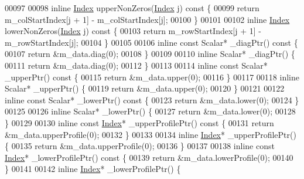 \begin{DoxyCode}
00097 
00098     \textcolor{keyword}{inline} \hyperlink{namespace_eigen_a62e77e0933482dafde8fe197d9a2cfde}{Index} upperNonZeros(\hyperlink{namespace_eigen_a62e77e0933482dafde8fe197d9a2cfde}{Index} j)\textcolor{keyword}{ const }\{
00099         \textcolor{keywordflow}{return} m\_colStartIndex[j + 1] - m\_colStartIndex[j];
00100     \}
00101 
00102     \textcolor{keyword}{inline} \hyperlink{namespace_eigen_a62e77e0933482dafde8fe197d9a2cfde}{Index} lowerNonZeros(\hyperlink{namespace_eigen_a62e77e0933482dafde8fe197d9a2cfde}{Index} j)\textcolor{keyword}{ const }\{
00103         \textcolor{keywordflow}{return} m\_rowStartIndex[j + 1] - m\_rowStartIndex[j];
00104     \}
00105 
00106     \textcolor{keyword}{inline} \textcolor{keyword}{const} Scalar* \_diagPtr()\textcolor{keyword}{ const }\{
00107         \textcolor{keywordflow}{return} &m\_data.diag(0);
00108     \}
00109 
00110     \textcolor{keyword}{inline} Scalar* \_diagPtr() \{
00111         \textcolor{keywordflow}{return} &m\_data.diag(0);
00112     \}
00113 
00114     \textcolor{keyword}{inline} \textcolor{keyword}{const} Scalar* \_upperPtr()\textcolor{keyword}{ const }\{
00115         \textcolor{keywordflow}{return} &m\_data.upper(0);
00116     \}
00117 
00118     \textcolor{keyword}{inline} Scalar* \_upperPtr() \{
00119         \textcolor{keywordflow}{return} &m\_data.upper(0);
00120     \}
00121 
00122     \textcolor{keyword}{inline} \textcolor{keyword}{const} Scalar* \_lowerPtr()\textcolor{keyword}{ const }\{
00123         \textcolor{keywordflow}{return} &m\_data.lower(0);
00124     \}
00125 
00126     \textcolor{keyword}{inline} Scalar* \_lowerPtr() \{
00127         \textcolor{keywordflow}{return} &m\_data.lower(0);
00128     \}
00129 
00130     \textcolor{keyword}{inline} \textcolor{keyword}{const} \hyperlink{namespace_eigen_a62e77e0933482dafde8fe197d9a2cfde}{Index}* \_upperProfilePtr()\textcolor{keyword}{ const }\{
00131         \textcolor{keywordflow}{return} &m\_data.upperProfile(0);
00132     \}
00133 
00134     \textcolor{keyword}{inline} \hyperlink{namespace_eigen_a62e77e0933482dafde8fe197d9a2cfde}{Index}* \_upperProfilePtr() \{
00135         \textcolor{keywordflow}{return} &m\_data.upperProfile(0);
00136     \}
00137 
00138     \textcolor{keyword}{inline} \textcolor{keyword}{const} \hyperlink{namespace_eigen_a62e77e0933482dafde8fe197d9a2cfde}{Index}* \_lowerProfilePtr()\textcolor{keyword}{ const }\{
00139         \textcolor{keywordflow}{return} &m\_data.lowerProfile(0);
00140     \}
00141 
00142     \textcolor{keyword}{inline} \hyperlink{namespace_eigen_a62e77e0933482dafde8fe197d9a2cfde}{Index}* \_lowerProfilePtr() \{

\end{DoxyCode}
